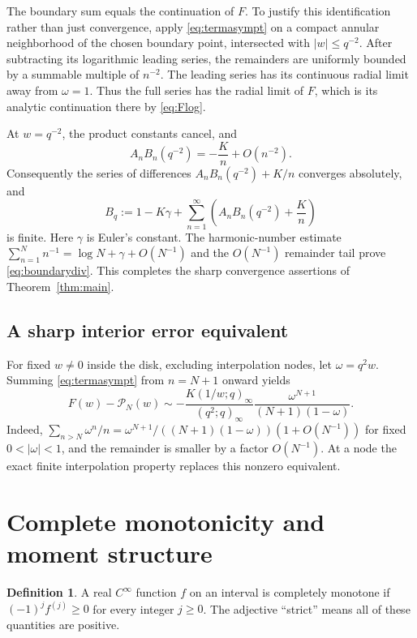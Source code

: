 \documentclass[11pt,letterpaper]{article}
\theoremstyle{definition}\newtheorem{definition}[theorem]{Definition}
\theoremstyle{remark}\newtheorem{remark}[theorem]{Remark}
\numberwithin{equation}{section}
\begin{document}
The boundary sum equals the continuation of $F$. To justify this identification rather than just convergence, apply \eqref{eq:termasympt} on a compact annular neighborhood of the chosen boundary point, intersected with $|w|\leq q^{-2}$. After subtracting its logarithmic leading series, the remainders are uniformly bounded by a summable multiple of $n^{-2}$. The leading series has its continuous radial limit away from $\omega=1$. Thus the full series has the radial limit of $F$, which is its analytic continuation there by \eqref{eq:Flog}.

At $w=q^{-2}$, the product constants cancel, and
\begin{equation}\label{eq:boundaryterm}
 A_nB_n(q^{-2})=-\frac Kn+O(n^{-2}).
\end{equation}
Consequently the series of differences $A_nB_n(q^{-2})+K/n$ converges absolutely, and
\[
 B_q:=1-K\gamma+\sum_{n=1}^{\infty}
 \left(A_nB_n(q^{-2})+\frac Kn\right)
\]
is finite. Here $\gamma$ is Euler's constant. The harmonic-number estimate $\sum_{n=1}^{N}n^{-1}=\log N+\gamma+O(N^{-1})$ and the $O(N^{-1})$ remainder tail prove \eqref{eq:boundarydiv}. This completes the sharp convergence assertions of Theorem~\ref{thm:main}.

\subsection{A sharp interior error equivalent}
For fixed $w\neq0$ inside the disk, excluding interpolation nodes, let $\omega=q^2w$. Summing \eqref{eq:termasympt} from $n=N+1$ onward yields
\begin{equation}\label{eq:tailasympt}
 F(w)-\mathcal P_N(w)\sim
 -\frac{K(1/w;q)_\infty}{(q^2;q)_\infty}
 \frac{\omega^{N+1}}{(N+1)(1-\omega)}.
\end{equation}
Indeed, $\sum_{n>N}\omega^n/n=\omega^{N+1}/((N+1)(1-\omega))(1+O(N^{-1}))$ for fixed $0<|\omega|<1$, and the remainder is smaller by a factor $O(N^{-1})$. At a node the exact finite interpolation property replaces this nonzero equivalent.

\section{Complete monotonicity and moment structure}\label{sec:CM}

\begin{definition}
A real $C^\infty$ function $f$ on an interval is completely monotone if $(-1)^jf^{(j)}\geq0$ for every integer $j\geq0$. The adjective ``strict'' means all of these quantities are positive.
\end{definition}
\end{document}

